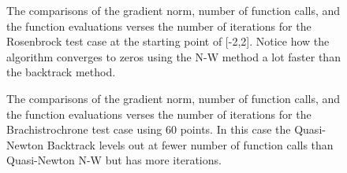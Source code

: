 \documentclass{article}
\begin{document}
\begin{figure}[htbp]
	\centering
	\qquad
	\caption{The comparisons of the gradient norm, number of function calls, and the function evaluations verses the number of iterations for the Rosenbrock test case at the starting point of [-2,2]. Notice how the algorithm converges to zeros using the N-W method a lot faster than the backtrack method.}
	\label{fig:rosen}
\end{figure}

\begin{figure}[htbp]
	\centering
	\qquad
	\caption{The comparisons of the gradient norm, number of function calls, and the function evaluations verses the number of iterations for the Brachistrochrone test case using 60 points. In this case the Quasi-Newton Backtrack levels out at fewer number of function calls than Quasi-Newton N-W but has more iterations. }
	\label{fig:brach}
\end{figure}
\end{document}
